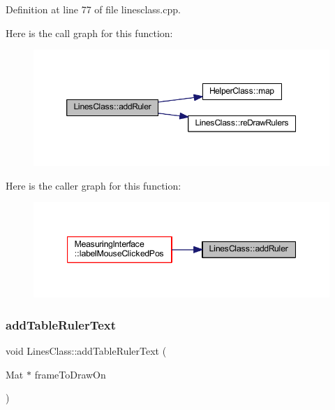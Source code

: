 Definition at line 77 of file linesclass.\+cpp.

Here is the call graph for this function\+:\nopagebreak
\begin{figure}[H]
\begin{center}
\leavevmode
\includegraphics[width=350pt]{class_lines_class_ab61cc7912d5903aec574d53847e7ebf2_cgraph}
\end{center}
\end{figure}
Here is the caller graph for this function\+:\nopagebreak
\begin{figure}[H]
\begin{center}
\leavevmode
\includegraphics[width=347pt]{class_lines_class_ab61cc7912d5903aec574d53847e7ebf2_icgraph}
\end{center}
\end{figure}
\mbox{\label{class_lines_class_a40228921775f778a33a391bad2830d1c}} 
\subsubsection{\texorpdfstring{addTableRulerText}{addTableRulerText}}
{\footnotesize\ttfamily void Lines\+Class\+::add\+Table\+Ruler\+Text (\begin{DoxyParamCaption}\item[{Mat $\ast$}]{frame\+To\+Draw\+On }\end{DoxyParamCaption})\hspace{0.3cm}{\ttfamily [slot]}}



